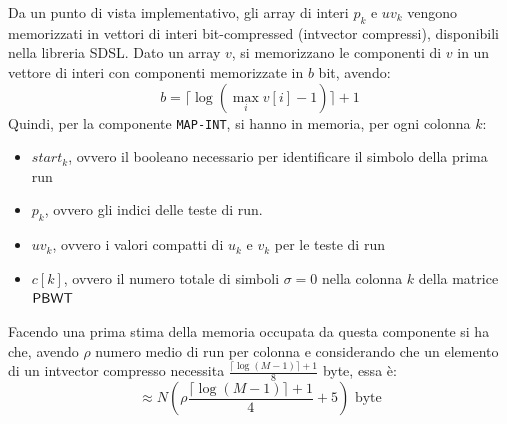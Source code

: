 Da un punto di vista implementativo, gli array di interi $p_k$ e $uv_k$ vengono
memorizzati in vettori di interi bit-compressed (intvector compressi),
disponibili nella libreria 
SDSL. Dato un array $v$,  si memorizzano le componenti di $v$ in un
vettore di interi con componenti memorizzate in $b$ bit, avendo:
\begin{equation}
  \label{eq:bc1}
  b=\lceil\log(\max_iv[i]-1)\rceil+1
\end{equation}
Quindi, per la componente \texttt{MAP-INT}, si hanno in memoria, per
ogni colonna $k$:
\begin{itemize}
  \item $start_k$, ovvero il booleano necessario per identificare il simbolo
  della prima run
  \item $p_k$, ovvero gli indici delle teste di run. 
  \item $uv_k$, ovvero i valori compatti di $u_k$ e $v_k$ per le teste di run
  \item $c[k]$, ovvero il numero totale di simboli $\sigma=0$ nella colonna
  $k$ della matrice $\mbox{\rm {\sf PBWT}}$
\end{itemize}
Facendo una prima stima della memoria occupata da questa componente si ha che,
avendo $\rho$ numero medio di run per colonna e considerando che un elemento di
un intvector 
compresso necessita $\frac{\lceil\log(M-1)\rceil+1}{8}$ byte, essa è:
\begin{equation}
  \label{eq:mapintmem}
  \approx N\left(\rho\frac{\lceil\log(M-1)\rceil+1}{4}+5\right)\mbox{ byte}
\end{equation}
